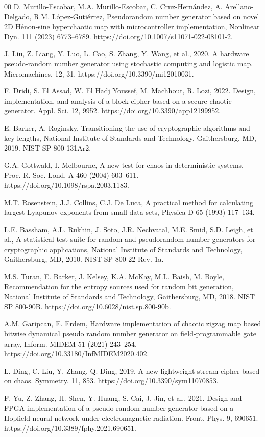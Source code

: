 \documentclass[preprint, 12pt, sort&compress]{elsarticle}
\begin{document}
\begin{thebibliography}{00}
D. Murillo-Escobar, M.A. Murillo-Escobar, C. Cruz-Hernández, A. Arellano-Delgado, R.M. López-Gutiérrez, Pseudorandom number generator based on novel 2D Hénon-sine hyperchaotic map with microcontroller implementation, Nonlinear Dyn. 111 (2023) 6773–6789. https://doi.org/10.1007/s11071-022-08101-2.

J. Liu, Z. Liang, Y. Luo, L. Cao, S. Zhang, Y. Wang, et al., 2020. A hardware pseudo-random number generator using stochastic computing and logistic map. Micromachines. 12, 31. https://doi.org/10.3390/mi12010031.

F. Dridi, S. El Assad, W. El Hadj Youssef, M. Machhout, R. Lozi, 2022. Design, implementation, and analysis of a block cipher based on a secure chaotic generator. Appl. Sci. 12, 9952. https://doi.org/10.3390/app12199952.

E. Barker, A. Roginsky, Transitioning the use of cryptographic algorithms and key lengths, National Institute of Standards and Technology, Gaithersburg, MD, 2019. NIST SP 800-131Ar2.

G.A. Gottwald, I. Melbourne, A new test for chaos in deterministic systems, Proc. R. Soc. Lond. A 460 (2004) 603–611. https://doi.org/10.1098/rspa.2003.1183.

M.T. Rosenstein, J.J. Collins, C.J. De Luca, A practical method for calculating largest Lyapunov exponents from small data sets, Physica D 65 (1993) 117–134.

L.E. Bassham, A.L. Rukhin, J. Soto, J.R. Nechvatal, M.E. Smid, S.D. Leigh, et al., A statistical test suite for random and pseudorandom number generators for cryptographic applications, National Institute of Standards and Technology, Gaithersburg, MD, 2010. NIST SP 800-22 Rev. 1a.

M.S. Turan, E. Barker, J. Kelsey, K.A. McKay, M.L. Baish, M. Boyle, Recommendation for the entropy sources used for random bit generation, National Institute of Standards and Technology, Gaithersburg, MD, 2018. NIST SP 800-90B. https://doi.org/10.6028/nist.sp.800-90b.

A.M. Garipcan, E. Erdem, Hardware implementation of chaotic zigzag map based bitwise dynamical pseudo random number generator on field-programmable gate array, Inform. MIDEM 51 (2021) 243–254. https://doi.org/10.33180/InfMIDEM2020.402.

L. Ding, C. Liu, Y. Zhang, Q. Ding, 2019. A new lightweight stream cipher based on chaos. Symmetry. 11, 853. https://doi.org/10.3390/sym11070853.

F. Yu, Z. Zhang, H. Shen, Y. Huang, S. Cai, J. Jin, et al., 2021. Design and FPGA implementation of a pseudo-random number generator based on a Hopfield neural network under electromagnetic radiation. Front. Phys. 9, 690651. https://doi.org/10.3389/fphy.2021.690651.

\end{thebibliography}
\end{document}
